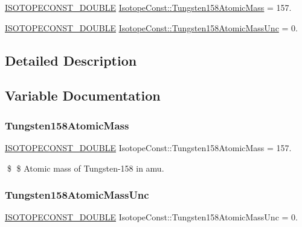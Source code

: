 \begin{DoxyCompactItemize}
\item 
\mbox{\hyperlink{group___isotope_const-_macros_ga8f45a7272ce02c0b4c65c44636ed719a}{I\+S\+O\+T\+O\+P\+E\+C\+O\+N\+S\+T\+\_\+\+D\+O\+U\+B\+LE}} \mbox{\hyperlink{group___isotope_const-_tungsten-_w158_gabe087b430f8afcb5330b9842dc188556}{Isotope\+Const\+::\+Tungsten158\+Atomic\+Mass}} = 157.
\item 
\mbox{\hyperlink{group___isotope_const-_macros_ga8f45a7272ce02c0b4c65c44636ed719a}{I\+S\+O\+T\+O\+P\+E\+C\+O\+N\+S\+T\+\_\+\+D\+O\+U\+B\+LE}} \mbox{\hyperlink{group___isotope_const-_tungsten-_w158_ga612b0c85ef7d6801f29503355fc09451}{Isotope\+Const\+::\+Tungsten158\+Atomic\+Mass\+Unc}} = 0.
\end{DoxyCompactItemize}


\subsection{Detailed Description}


\subsection{Variable Documentation}
\mbox{\label{group___isotope_const-_tungsten-_w158_gabe087b430f8afcb5330b9842dc188556}} 
\subsubsection{\texorpdfstring{Tungsten158\+Atomic\+Mass}{Tungsten158AtomicMass}}
{\footnotesize\ttfamily \mbox{\hyperlink{group___isotope_const-_macros_ga8f45a7272ce02c0b4c65c44636ed719a}{I\+S\+O\+T\+O\+P\+E\+C\+O\+N\+S\+T\+\_\+\+D\+O\+U\+B\+LE}} Isotope\+Const\+::\+Tungsten158\+Atomic\+Mass = 157.}

\$ \$ Atomic mass of Tungsten-\/158 in amu. \mbox{\label{group___isotope_const-_tungsten-_w158_ga612b0c85ef7d6801f29503355fc09451}} 
\subsubsection{\texorpdfstring{Tungsten158\+Atomic\+Mass\+Unc}{Tungsten158AtomicMassUnc}}
{\footnotesize\ttfamily \mbox{\hyperlink{group___isotope_const-_macros_ga8f45a7272ce02c0b4c65c44636ed719a}{I\+S\+O\+T\+O\+P\+E\+C\+O\+N\+S\+T\+\_\+\+D\+O\+U\+B\+LE}} Isotope\+Const\+::\+Tungsten158\+Atomic\+Mass\+Unc = 0.}

